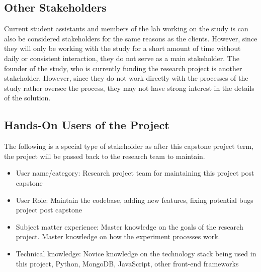 \documentclass[12pt]{article}
\begin{document}
\subsection{Other Stakeholders}
Current student assistants and members of the lab working on the study is can also be
considered stakeholders for the same reasons as the clients. However, since they
will only be working with the study for a short amount of time without daily or
consistent interaction, they do not serve as a main stakeholder. The founder of
the study, who is currently funding the research project is another stakeholder.
However, since they do not work directly with the processes of the study rather
oversee the process, they may not have strong interest in the details of the solution. 
\subsection{Hands-On Users of the Project}
\label{sec:2.4}
The following is a special type of stakeholder as after this capstone project
term, the project will be passed back to the research team to maintain. 
\begin{itemize}
  \item User name/category: Research project team for maintaining this project post capstone 
  \item User Role: Maintain the codebase, adding new features, fixing potential bugs
  project post capstone
  \item Subject matter experience: Master knowledge on the goals of the research
  project. Master knowledge on how the experiment processes work. 
  \item Technical knowledge: Novice knowledge on the technology stack being
  used in this project, Python, MongoDB, JavaScript, other front-end frameworks 
\end{itemize}
\end{document}
